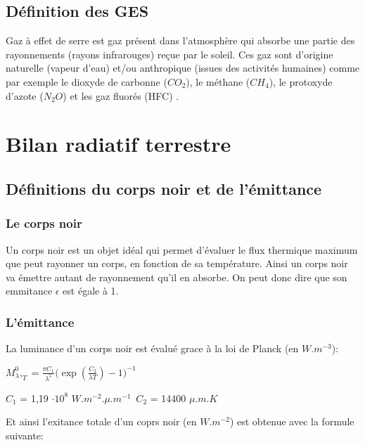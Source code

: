 \documentclass[a4paper, 12pt]{report} %
\begin{document}
\subsection{Définition des GES}
Gaz à effet de serre est gaz présent dans l'atmosphère qui 
absorbe une partie des rayonnements (rayons infrarouges) 
reçue par le soleil. Ces gaz sont d'origine naturelle 
(vapeur d'eau) et/ou anthropique 
(issues des activités humaines) comme par exemple le dioxyde 
de carbonne ($CO_2$), le méthane ($CH_4$), le protoxyde d'azote
($N_2O$) et les gaz fluorés (HFC) . \vspace{\baselineskip}


\section{Bilan radiatif terrestre}
\subsection{Définitions du corps noir et de l'émittance}

\subsubsection{Le corps noir}
Un corps noir est un objet idéal qui permet d'évaluer le flux thermique maximum
que peut rayonner un corps, en fonction de sa température. Ainsi un corps noir 
va émettre autant de rayonnement qu'il en absorbe. On peut donc dire que son 
emmitance $ \epsilon$  est égale à 1. 

\subsubsection{L'émittance} 

La luminance d'un corps noir est évalué grace à la loi de Planck 
(en $W.m^{-3}$): \vspace{\baselineskip}

\begin{center}
$M^{0}_\lambda,_T= \frac{\pi C_1}{\lambda^5} \biggl(\exp(\frac{C_2}{\lambda T}) - 1\biggr)^{-1}$ 

$C_1$ = 1,19 $\cdot 10^{8}$ $W.m^{-2}.\mu.m^{-1}$\
$C_2$ = 14400 $\mu.m.K$ \\
\end{center}
Et ainsi l'exitance totale d'un coprs noir (en $W.m^{-2}$) est obtenue avec la formule suivante:
\end{document}
